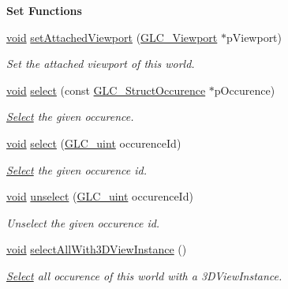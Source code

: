 \begin{Indent}{\bf Set Functions}
\begin{DoxyCompactItemize}
\hyperlink{group___u_a_v_objects_plugin_ga444cf2ff3f0ecbe028adce838d373f5c}{void} \hyperlink{class_g_l_c___world_ae902293879b6b905a1f62e33c4778130}{set\-Attached\-Viewport} (\hyperlink{class_g_l_c___viewport}{G\-L\-C\-\_\-\-Viewport} $\ast$p\-Viewport)
\begin{DoxyCompactList}\small\item\em Set the attached viewport of this world. \end{DoxyCompactList}\item 
\hyperlink{group___u_a_v_objects_plugin_ga444cf2ff3f0ecbe028adce838d373f5c}{void} \hyperlink{class_g_l_c___world_a4fcba2f5fef345f815514db8cc473f40}{select} (const \hyperlink{class_g_l_c___struct_occurence}{G\-L\-C\-\_\-\-Struct\-Occurence} $\ast$p\-Occurence)
\begin{DoxyCompactList}\small\item\em \hyperlink{class_select}{Select} the given occurence. \end{DoxyCompactList}\item 
\hyperlink{group___u_a_v_objects_plugin_ga444cf2ff3f0ecbe028adce838d373f5c}{void} \hyperlink{class_g_l_c___world_a152c2f92cdef90c94336f51a2b32de6b}{select} (\hyperlink{glc__global_8h_abf950976fabed69026558df8e2da6c6b}{G\-L\-C\-\_\-uint} occurence\-Id)
\begin{DoxyCompactList}\small\item\em \hyperlink{class_select}{Select} the given occurence id. \end{DoxyCompactList}\item 
\hyperlink{group___u_a_v_objects_plugin_ga444cf2ff3f0ecbe028adce838d373f5c}{void} \hyperlink{class_g_l_c___world_adf32c0e2426064cc0780ec3b12ba399e}{unselect} (\hyperlink{glc__global_8h_abf950976fabed69026558df8e2da6c6b}{G\-L\-C\-\_\-uint} occurence\-Id)
\begin{DoxyCompactList}\small\item\em Unselect the given occurence id. \end{DoxyCompactList}\item 
\hyperlink{group___u_a_v_objects_plugin_ga444cf2ff3f0ecbe028adce838d373f5c}{void} \hyperlink{class_g_l_c___world_a5b6e06a2077132160a2f785bf6f38678}{select\-All\-With3\-D\-View\-Instance} ()
\begin{DoxyCompactList}\small\item\em \hyperlink{class_select}{Select} all occurence of this world with a 3\-D\-View\-Instance. \end{DoxyCompactList}\item 

\end{DoxyCompactItemize}
\end{Indent}
